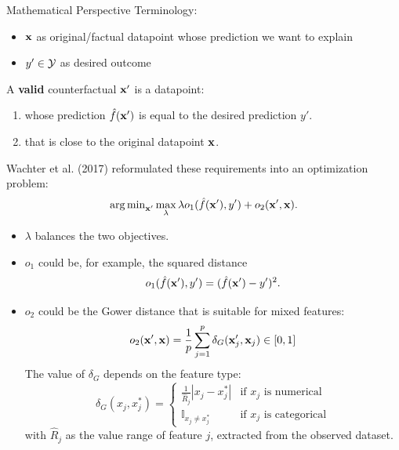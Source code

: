 \documentclass[11pt,compress,t,notes=noshow, xcolor=table]{beamer}
\begin{document}
\begin{vbframe}{Mathematical Perspective}
	Terminology: 
	\begin{itemize}
		\item $\xv$ as original/factual datapoint whose prediction we want to explain
		\item $y' \in \Yspace$ as desired outcome 
	\end{itemize}
	\vspace{0.3cm}
	A \textbf{valid} counterfactual $\xv'$ is a datapoint: 
	\begin{enumerate}
		\item whose prediction $\fh(\xv')$ is equal to the desired prediction $y'$. 
		\item that is close to the original datapoint $\xv$.
	\end{enumerate}
	Wachter et al. (2017) reformulated these requirements into an optimization problem: 
	\begin{equation}
		\argmin_{\xv'} \max_{\lambda} \lambda o_1(\fh(\xv'), y') + o_2(\xv', \xv).
		\label{eq:wachter}
	\end{equation}
	\begin{itemize}
		\item $\lambda$ balances the two objectives.
		\item $o_1$ could be, for example, the squared distance $$o_1(\fh(\xv'), y') = (\fh(\xv') - y')^2.$$
		\item $o_2$ could be the Gower distance that is suitable for mixed features: 
		$$o_2(\xv', \xv) = \frac{1}{p}\sum_{j = 1}^{p} \delta_G(\xv'_j, \xv_j)\in [0, 1]$$
		The value of $\delta_G$ depends on the feature type:
		\begin{equation*}
		\delta_G(x_j, x^*_j) = 
		\begin{cases}
		\frac{1}{\widehat{R}_j}|x_j- x^*_j| & \text{if $x_j$ is numerical} \\
		\mathbb{I}_{x_j \neq x_j^*} & \text{if $x_j$ is categorical}
		\end{cases}
		\end{equation*}
		with $\widehat{R}_j$ as the value range of feature $j$, extracted from the observed dataset. 
	\end{itemize}
\end{vbframe}
\end{document}
